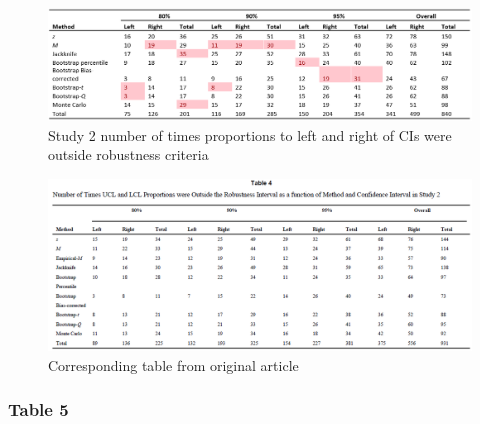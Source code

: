 \documentclass[10,a4paperpaper,]{article}
\begin{document}
\newpage
\begin{landscape}

\begin{figure}
\includegraphics[width=1\linewidth]{RepliSimsTable4} \caption{Study 2 number of times proportions to left and right of CIs were outside robustness criteria}\label{fig:unnamed-chunk-7}
\end{figure}

\begin{figure}
\includegraphics[width=1\linewidth]{RepliSimsMacKinnonTable4} \caption{Corresponding table from original article}\label{fig:unnamed-chunk-8}
\end{figure}

\end{landscape}

\newpage

\subsubsection{Table 5}
\end{document}
